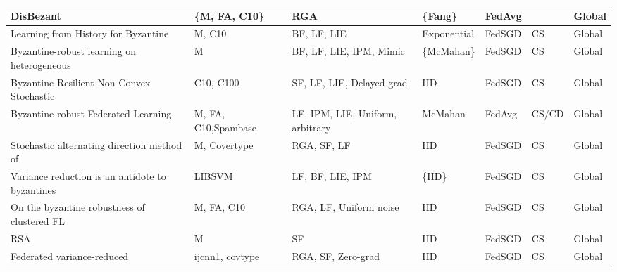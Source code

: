 \begin{table*}[]
\begin{tabular}{|l|p{2cm}|p{2.7cm}|l|p{1.5cm}|p{.7cm}|l|}
DisBezant~\cite{ma2022disbezant}                                       & \{M, FA, C10\}       & RGA                              & \{Fang\}                   & FedAvg                &                  & Global              \\ \hline
Learning from History for Byzantine~\cite{praneeth2020learning}             & M, C10               & BF, LF, LIE                      & Exponential                & FedSGD                & CS               & Global              \\ \hline
Byzantine-robust learning on heterogeneous~\cite{karimireddy2020byzantine}      & M                    & BF, LF, LIE, IPM, Mimic          & \{McMahan\}                & FedSGD                & CS               & Global              \\ \hline
Byzantine-Resilient Non-Convex Stochastic~\cite{allen2020byzantine}       & C10, C100            & SF, LF, LIE, Delayed-grad        & IID                        & FedSGD                & CS               & Global              \\ \hline
Byzantine-robust Federated Learning~\cite{li2021byzantine}          & M, FA, C10,Spambase  & LF, IPM, LIE, Uniform, arbitrary & McMahan                    & FedAvg                & CS/CD            & Global              \\ \hline
Stochastic alternating direction method of~\cite{lin2021stochastic}      & M, Covertype         & RGA, SF, LF                      & IID                        & FedSGD                & CS               & Global              \\ \hline
Variance reduction is an antidote to byzantines~\cite{gorbunov2022variance} & LIBSVM               & LF, BF, LIE, IPM                 & \{IID\}                    & FedSGD                & CS               & Global              \\ \hline
On the byzantine robustness of clustered FL~\cite{sattler2020byzantine}     & M, FA, C10           & RGA, LF, Uniform noise           & IID                        & FedSGD                & CS               & Global              \\ \hline
RSA~\cite{li2019rsa}      & M                    & SF                               & IID                        & FedSGD                & CS               & Global              \\ \hline
Federated variance-reduced~\cite{wu2020federated}                      & ijcnn1, covtype      & RGA, SF, Zero-grad               & IID                        & FedSGD                & CS               & Global              \\ \hline

\end{tabular}
\end{table*}
